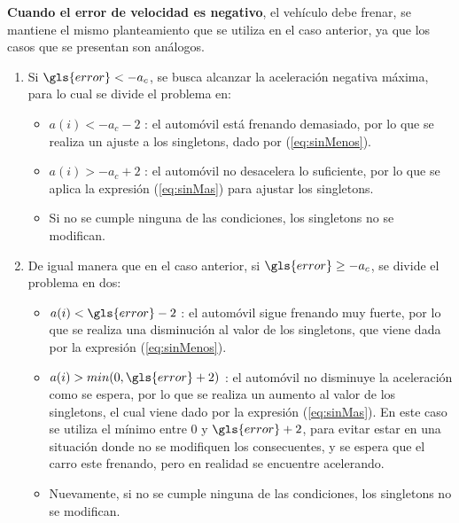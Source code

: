  
\textbf{Cuando el error de velocidad es negativo}, el vehículo debe frenar, se mantiene el mismo planteamiento que se utiliza en el caso anterior, ya que los casos que se presentan son análogos.

\begin{enumerate}
\item Si $\gls{error}<-a_c$, se busca alcanzar la aceleración negativa máxima, para lo cual se divide el problema en:
\begin{itemize}
\item $a(i) < -a_c -2$ : el automóvil está frenando demasiado, por lo que se realiza un ajuste a los singletons, dado por (\ref{eq:sinMenos}).
\item $a(i) > -a_c +2$ : el automóvil no desacelera lo suficiente, por lo que se aplica la expresión (\ref{eq:sinMas}) para ajustar los singletons.
\item Si no se cumple ninguna de las condiciones, los singletons no se modifican.
\end{itemize}


\item De igual manera que en el caso anterior, si $\gls{error} \geq -a_c$, se divide el problema en dos:
\begin{itemize}
\item $a(i) < \gls{error}-2$ : el automóvil sigue frenando muy fuerte, por lo que se realiza una disminución al valor de los singletons, que viene dada por la expresión (\ref{eq:sinMenos}).
\item $a(i) > min(0,\gls{error}+2)$ : el automóvil no disminuye la aceleración como se espera, por lo que se realiza un aumento al valor de los singletons, el cual viene dado por la expresión (\ref{eq:sinMas}). En este caso se utiliza el mínimo entre $0$ y $\gls{error}+2$, para evitar estar en una situación donde no se modifiquen los consecuentes, y se espera que el carro este frenando, pero en realidad se encuentre acelerando.
\item Nuevamente, si no se cumple ninguna de las condiciones, los singletons no se modifican.
\end{itemize}

\end{enumerate}



